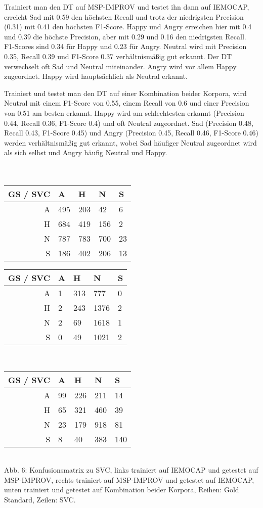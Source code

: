 \documentclass{article} %
\begin{document}
Trainiert man den DT auf MSP-IMPROV und testet ihn dann auf IEMOCAP, erreicht Sad mit 0.59 den höchsten Recall und trotz der niedrigsten Precision (0.31) mit 0.41 den höchsten F1-Score. 
Happy und Angry erreichen hier mit 0.4 und 0.39 die höchste Precision, aber mit 0.29 und 0.16 den niedrigsten Recall. F1-Scores sind 0.34 für Happy und 0.23 für Angry. Neutral wird mit Precision 0.35, Recall 0.39 und F1-Score 0.37 verhältnismäßig gut erkannt. 
Der DT verwechselt oft Sad und Neutral miteinander. Angry wird vor allem Happy zugeordnet. Happy wird hauptsächlich als Neutral erkannt. 

Trainiert und testet man den DT auf einer Kombination beider Korpora, wird Neutral mit einem F1-Score von 0.55, einem Recall von 0.6 und einer Precision von 0.51 am besten erkannt. Happy wird am schlechtesten erkannt (Precision 0.44, Recall 0.36, F1-Score 0.4) und oft Neutral zugeordnet. Sad (Precision 0.48, Recall 0.43, F1-Score 0.45) und Angry (Precision 0.45, Recall 0.46, F1-Score 0.46) werden verhältnismäßig gut erkannt, wobei Sad häufiger Neutral zugeordnet wird als sich selbst und Angry häufig Neutral und Happy. \\ \\ \\
\begin{tabular}{|r|llll|}
\hline
GS / SVC & A & H & N & S \\
\hline
A & 495 & 203 & 42 & 6 \\
H & 684 & 419 & 156 & 2 \\
N & 787 & 783 & 700 & 23 \\
S & 186 & 402 & 206 & 13 \\
\hline
\end{tabular}
\begin{tabular}{|r|llll|}
\hline
GS / SVC & A & H & N & S \\
\hline
A & 1 & 313 & 777 & 0 \\
H & 2 & 243 & 1376 & 2 \\
N & 2 & 69 & 1618 & 1 \\
S & 0 & 49 & 1021 & 2 \\
\hline
\end{tabular} \\
\begin{tabular}{|r|llll|}
\hline
GS / SVC & A & H & N & S \\
\hline
A & 99 & 226 & 211 & 14 \\
H & 65 & 321 & 460 & 39 \\
N & 23 & 179 & 918 & 81 \\
S & 8 & 40 & 383 & 140 \\
\hline
\end{tabular} \\
Abb. 6: Konfusionsmatrix zu SVC, links trainiert auf IEMOCAP und getestet auf MSP-IMPROV, rechts trainiert auf MSP-IMPROV und getestet auf IEMOCAP, unten trainiert und getestet auf Kombination beider Korpora, Reihen: Gold Standard, Zeilen: SVC. \\ \\
\end{document}
